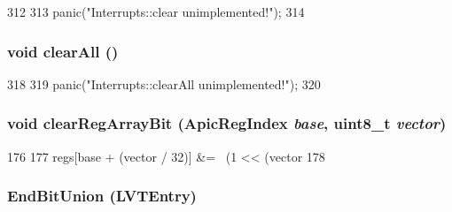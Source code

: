 \begin{DoxyCode}
312     {
313         panic("Interrupts::clear unimplemented!\n");
314     }
\end{DoxyCode}
\hypertarget{classX86ISA_1_1Interrupts_a798729dca95209ecdc609807a653a2bf}{
\subsubsection[{clearAll}]{\setlength{\rightskip}{0pt plus 5cm}void clearAll ()}}
\label{classX86ISA_1_1Interrupts_a798729dca95209ecdc609807a653a2bf}



\begin{DoxyCode}
318     {
319         panic("Interrupts::clearAll unimplemented!\n");
320     }
\end{DoxyCode}
\hypertarget{classX86ISA_1_1Interrupts_a6ccfdb5e91c1463b861d5cd6cbb23c46}{
\subsubsection[{clearRegArrayBit}]{\setlength{\rightskip}{0pt plus 5cm}void clearRegArrayBit ({\bf ApicRegIndex} {\em base}, \/  uint8\_\-t {\em vector})}}
\label{classX86ISA_1_1Interrupts_a6ccfdb5e91c1463b861d5cd6cbb23c46}



\begin{DoxyCode}
176     {
177         regs[base + (vector / 32)] &= ~(1 << (vector %
178     }
\end{DoxyCode}
\hypertarget{classX86ISA_1_1Interrupts_a3dcded9d0e81db3da6da13a1ce23ef0c}{
\subsubsection[{EndBitUnion}]{\setlength{\rightskip}{0pt plus 5cm}EndBitUnion (LVTEntry)}}
\label{classX86ISA_1_1Interrupts_a3dcded9d0e81db3da6da13a1ce23ef0c}



